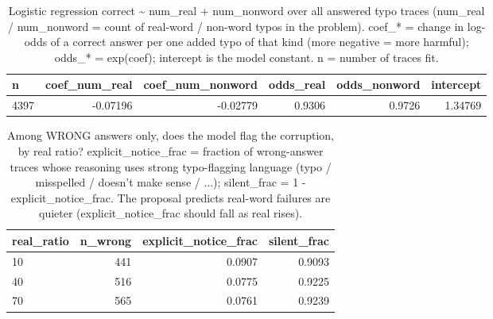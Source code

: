 \documentclass[11pt]{article}
\begin{document}
\begin{table}[H]
\centering
\caption{Logistic regression correct \textasciitilde{} num\_real + num\_nonword over all answered typo traces (num\_real / num\_nonword = count of real-word / non-word typos in the problem). coef\_* = change in log-odds of a correct answer per one added typo of that kind (more negative = more harmful); odds\_* = exp(coef); intercept is the model constant. n = number of traces fit.}
\small
\begin{adjustbox}{max width=\textwidth}
\begin{tabular}{lrrrrr}
\toprule
\textbf{n} & \textbf{coef\_num\_real} & \textbf{coef\_num\_nonword} & \textbf{odds\_real} & \textbf{odds\_nonword} & \textbf{intercept} \\
\midrule
4397 & -0.07196 & -0.02779 & 0.9306 & 0.9726 & 1.34769 \\
\bottomrule
\end{tabular}
\end{adjustbox}
\end{table}

\begin{table}[H]
\centering
\caption{Among WRONG answers only, does the model flag the corruption, by real ratio? explicit\_notice\_frac = fraction of wrong-answer traces whose reasoning uses strong typo-flagging language (typo / misspelled / doesn't make sense / ...); silent\_frac = 1 - explicit\_notice\_frac. The proposal predicts real-word failures are quieter (explicit\_notice\_frac should fall as real rises).}
\small
\begin{adjustbox}{max width=\textwidth}
\begin{tabular}{lrrr}
\toprule
\textbf{real\_ratio} & \textbf{n\_wrong} & \textbf{explicit\_notice\_frac} & \textbf{silent\_frac} \\
\midrule
10 & 441 & 0.0907 & 0.9093 \\
40 & 516 & 0.0775 & 0.9225 \\
70 & 565 & 0.0761 & 0.9239 \\
\bottomrule
\end{tabular}
\end{adjustbox}
\end{table}
\end{document}
